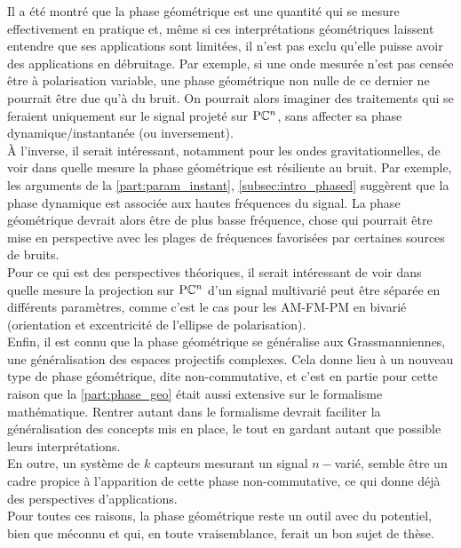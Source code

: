 Il a été montré que la phase géométrique est une quantité qui se mesure effectivement en pratique et, même si ces interprétations géométriques laissent entendre que ses applications sont limitées, il n'est pas exclu qu'elle puisse avoir des applications en débruitage. Par exemple, si une onde mesurée n'est pas censée être à polarisation variable, une phase géométrique non nulle de ce dernier ne pourrait être due qu'à du bruit. On pourrait alors imaginer des traitements qui se feraient uniquement sur le signal projeté sur $\text{\normalfont P}\mathbb{C}^{n}$, sans affecter sa phase dynamique/instantanée (ou inversement).
\\
À l'inverse, il serait intéressant, notamment pour les ondes gravitationnelles, de voir dans quelle mesure la phase géométrique est résiliente au bruit. Par exemple, les arguments de la \cref{part:param_instant}, \cref{subsec:intro_phased} suggèrent que la phase dynamique est associée aux hautes fréquences du signal. La phase géométrique devrait alors être de plus basse fréquence, chose qui pourrait être mise en perspective avec les plages de fréquences favorisées par certaines sources de bruits.
\\

Pour ce qui est des perspectives théoriques, il serait intéressant de voir dans quelle mesure la projection sur $\text{\normalfont P}\mathbb{C}^{n}$ d'un signal multivarié peut être séparée en différents paramètres, comme c'est le cas pour les AM-FM-PM en bivarié (orientation et excentricité de l'ellipse de polarisation).
\\
Enfin, il est connu que la phase géométrique se généralise aux Grassmanniennes, une généralisation des espaces projectifs complexes.
Cela donne lieu à un nouveau type de phase géométrique, dite non-commutative, et c'est en partie pour cette raison que la \cref{part:phase_geo} était aussi extensive sur le formalisme mathématique. 
Rentrer autant dans le formalisme devrait faciliter la généralisation des concepts mis en place, le tout en gardant autant que possible leurs interprétations.
\\
En outre, un système de $k$ capteurs mesurant un signal $n-$varié, semble être un cadre propice à l'apparition de cette phase non-commutative, ce qui donne déjà des perspectives d'applications.
\\

Pour toutes ces raisons, la phase géométrique reste un outil avec du potentiel, bien que méconnu et qui, en toute vraisemblance, ferait un bon sujet de thèse.